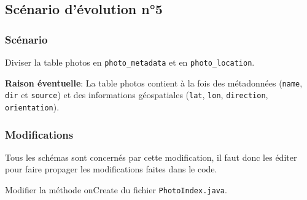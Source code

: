 \subsection{Scénario d'évolution n°5}
\subsubsection{Scénario}
Diviser la table photos en \texttt{photo_metadata} et en \texttt{photo_location}.

\textbf{Raison éventuelle}: La table photos contient à la fois des métadonnées (\texttt{name}, \texttt{dir} et \texttt{source}) et des informations géospatiales (\texttt{lat}, \texttt{lon}, \texttt{direction}, \texttt{orientation}).

\subsubsection{Modifications}
Tous les schémas sont concernés par cette modification, il faut donc les éditer pour faire propager les modifications faites dans le code.

Modifier la méthode onCreate du fichier \texttt{PhotoIndex.java}.

